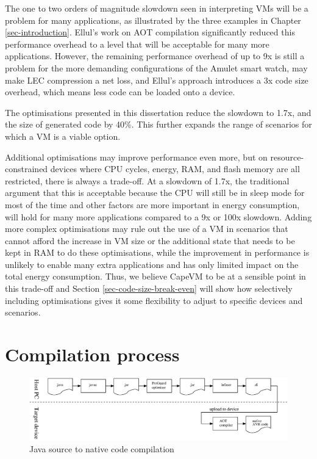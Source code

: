 The one to two orders of magnitude slowdown seen in interpreting VMs will be a problem for many applications, as illustrated by the three examples in Chapter \ref{sec-introduction}. Ellul's work \cite{Ellul:2012thesis} on AOT compilation significantly reduced this performance overhead to a level that will be acceptable for many more applications. However, the remaining performance overhead of up to 9x is still a problem for the more demanding configurations of the Amulet smart watch, may make LEC compression a net loss, and Ellul's approach introduces a 3x code size overhead, which means less code can be loaded onto a device.

The optimisations presented in this dissertation reduce the slowdown to 1.7x, and the size of generated code by 40\%. This further expands the range of scenarios for which a VM is a viable option.

Additional optimisations may improve performance even more, but on resource-constrained devices where CPU cycles, energy, RAM, and flash memory are all restricted, there is always a trade-off. At a slowdown of 1.7x, the traditional argument that this is acceptable because the CPU will still be in sleep mode for most of the time and other factors are more important in energy consumption, will hold for many more applications compared to a 9x or 100x slowdown. Adding more complex optimisations may rule out the use of a VM in scenarios that cannot afford the increase in VM size or the additional state that needs to be kept in RAM to do these optimisations, while the improvement in performance is unlikely to enable many extra applications and has only limited impact on the total energy consumption. Thus, we believe CapeVM to be at a sensible point in this trade-off and Section \ref{sec-code-size-break-even} will show how selectively including optimisations gives it some flexibility to adjust to specific devices and scenarios.


\section{Compilation process}
\label{sec-compilation-process}

\begin{figure}
\includegraphics[width=\linewidth]{compilation-process.eps}
\caption{Java source to native code compilation}
\label{fig-translation-process}
\end{figure}

